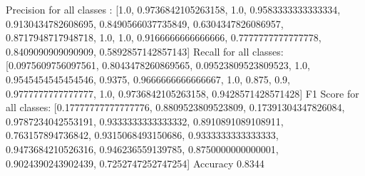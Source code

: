 Precision for all classes : [1.0, 0.9736842105263158, 1.0, 0.9583333333333334, 0.9130434782608695, 0.8490566037735849, 0.6304347826086957, 0.8717948717948718, 1.0, 1.0, 0.9166666666666666, 0.7777777777777778, 0.8409090909090909, 0.5892857142857143]
Recall for all classes: [0.0975609756097561, 0.8043478260869565, 0.09523809523809523, 1.0, 0.9545454545454546, 0.9375, 0.9666666666666667, 1.0, 0.875, 0.9, 0.9777777777777777, 1.0, 0.9736842105263158, 0.9428571428571428]
F1 Score for all classes: [0.17777777777777776, 0.8809523809523809, 0.17391304347826084, 0.9787234042553191, 0.9333333333333332, 0.8910891089108911, 0.763157894736842, 0.9315068493150686, 0.9333333333333333, 0.9473684210526316, 0.946236559139785, 0.8750000000000001, 0.9024390243902439, 0.7252747252747254]
Accuracy 0.8344
